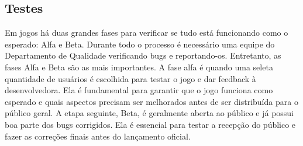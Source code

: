 \documentclass[12pt, 
openright, 
oneside, 
a4paper,    
brazil]{facom-ufu-abntex2}
\begin{document}
\subsection{Testes}
Em jogos há duas grandes fases para verificar se tudo está funcionando como o esperado: Alfa e Beta. Durante todo o processo é necessário uma equipe do Departamento de Qualidade verificando bugs e reportando-os. Entretanto, as fases Alfa e Beta são as mais importantes. A fase alfa é quando uma seleta quantidade de usuários é escolhida para testar o jogo e dar feedback à desenvolvedora. Ela é fundamental para garantir que o jogo funciona como esperado e quais aspectos precisam ser melhorados antes de ser distribuída para o público geral. A etapa seguinte, Beta, é geralmente aberta ao público e já possui boa parte dos bugs corrigidos. Ela é essencial para testar a recepção do público e fazer as correções finais antes do lançamento oficial.
\end{document}

